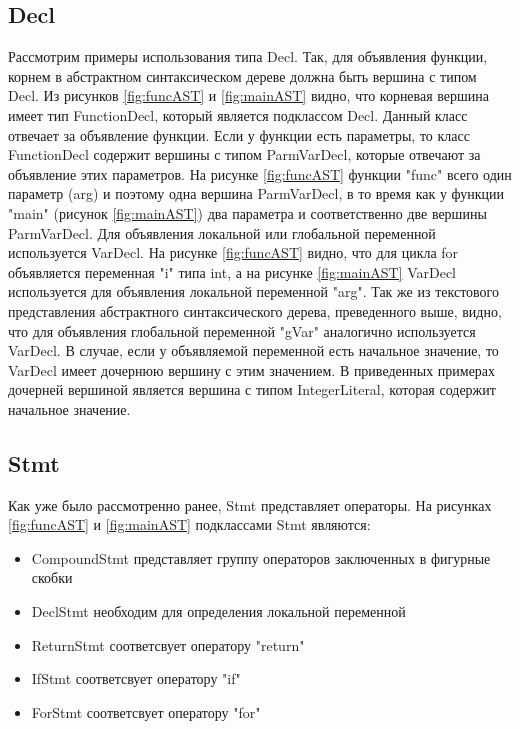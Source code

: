 \subsection*{Decl}
Рассмотрим примеры использования типа Decl. Так, для объявления функции, корнем в абстрактном 
синтаксическом дереве должна быть вершина с типом Decl. Из рисунков \ref{fig:funcAST} и \ref{fig:mainAST} 
видно, что корневая вершина имеет тип FunctionDecl, который является подклассом Decl. Данный класс 
отвечает за объявление функции. Если у функции есть параметры, то класс FunctionDecl содержит 
вершины с типом ParmVarDecl, которые отвечают за объявление этих параметров. На рисунке 
\ref{fig:funcAST} функции "func" всего один параметр (arg) и поэтому одна вершина ParmVarDecl, 
в то время как у функции "main" (рисунок \ref{fig:mainAST}) два параметра и 
соответственно две вершины ParmVarDecl. Для объявления локальной или глобальной переменной 
используется VarDecl. На рисунке \ref{fig:funcAST} видно, что для цикла for объявляется переменная "i" типа int,
а на рисунке \ref{fig:mainAST} VarDecl используется для объявления локальной переменной "arg". Так же из
текстового представления абстрактного синтаксического дерева, преведенного выше, видно, что для 
объявления глобальной переменной "gVar" аналогично используется VarDecl. В случае, если у объявляемой 
переменной есть начальное значение, то VarDecl имеет дочернюю вершину с этим значением. В приведенных
примерах дочерней вершиной является вершина с типом IntegerLiteral, которая содержит начальное значение.

\subsection*{Stmt}
Как уже было рассмотренно ранее, Stmt представляет операторы. На рисунках \ref{fig:funcAST} и \ref{fig:mainAST} 
подклассами Stmt являются:
\begin{itemize}
 \item CompoundStmt представляет группу операторов заключенных в фигурные скобки
 \item DeclStmt необходим для определения локальной переменной
 \item ReturnStmt соответсвует оператору "return"
 \item IfStmt соответсвует оператору "if"
 \item ForStmt соответсвует оператору "for"
\end{itemize}

